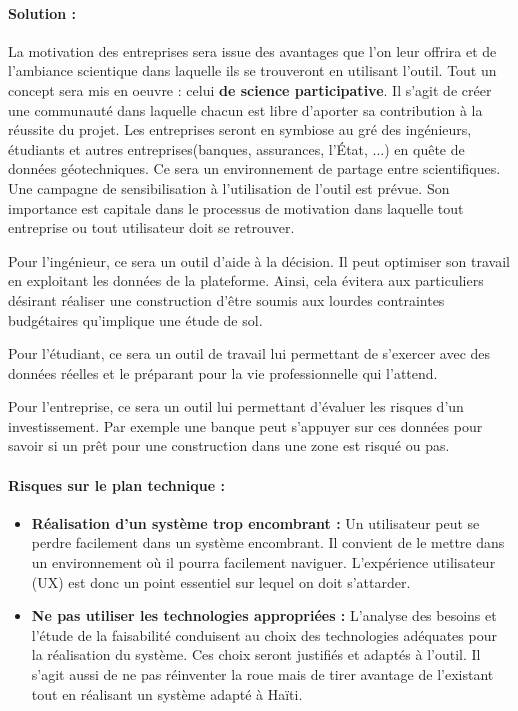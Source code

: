         \paragraph{Solution :}
        La motivation des entreprises sera issue des avantages que l'on leur offrira et de l'ambiance
        scientique dans laquelle ils se trouveront en utilisant l'outil. 
        Tout un concept sera mis en oeuvre : celui  \textbf{de science participative}.
        Il s'agit de créer une communauté dans laquelle chacun est libre d'aporter sa contribution 
        à la réussite du projet. Les entreprises seront en symbiose au gré des ingénieurs, étudiants 
        et autres entreprises(banques, assurances, l'État, ...) en quête de données géotechniques.
        Ce sera un environnement de partage entre scientifiques. Une campagne de sensibilisation à l'utilisation 
        de l'outil est prévue. Son importance est capitale dans le processus de motivation dans laquelle 
        tout entreprise ou tout utilisateur doit se retrouver.
        \par
        Pour l'ingénieur, ce sera un outil d'aide à la décision. Il peut optimiser son travail en exploitant
        les données de la plateforme. Ainsi, cela évitera aux particuliers désirant réaliser une construction
        d'être soumis aux lourdes contraintes budgétaires qu'implique une étude de sol.
        \par
        Pour l'étudiant, ce sera un outil de travail lui permettant de s'exercer avec des données réelles 
        et le préparant pour la vie professionnelle qui l'attend.
        \par
        Pour l'entreprise, ce sera un outil lui permettant d'évaluer les risques d'un investissement. Par 
        exemple une banque peut s'appuyer sur ces données pour savoir si un prêt pour une construction dans une zone
        est risqué ou pas.

        \paragraph{Risques sur le plan technique :}
        \begin{itemize}
            \item \textbf{Réalisation d'un système trop encombrant :}
            Un utilisateur peut se perdre facilement dans un système encombrant. Il convient de le mettre dans un environnement
            où il pourra facilement naviguer. L'expérience utilisateur (UX) est donc un point essentiel sur lequel on doit s'attarder.
            \item \textbf{Ne pas utiliser les technologies appropriées :}
            L'analyse des besoins et l'étude de la faisabilité conduisent au choix des technologies adéquates pour la réalisation
            du système. Ces choix seront justifiés et adaptés à l'outil. 
            Il s'agit aussi de ne pas réinventer la roue mais de tirer avantage de l'existant tout en réalisant 
            un système adapté à Haïti.
        \end{itemize}

